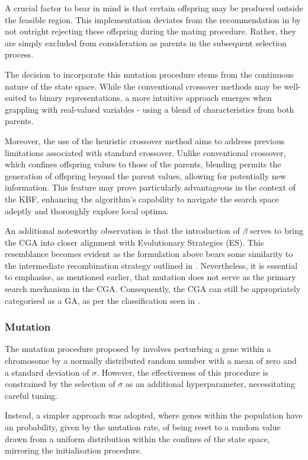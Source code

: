\documentclass[10pt]{article}
\begin{document}
\begin{multicols}{2}
A crucial factor to bear in mind is that certain offspring may be produced outside the feasible region. This implementation deviates from the recommendation in \cite{Michalewicz_2011} by not outright rejecting these offspring during the mating procedure. Rather, they are simply excluded from consideration as parents in the subsequent selection process.

The decision to incorporate this mutation procedure stems from the continuous nature of the state space. While the conventional crossover methods may be well-suited to binary representations, a more intuitive approach emerges when grappling with real-valued variables - using a blend of characteristics from both parents.

Moreover, the use of the heuristic crossover method aims to address previous limitations associated with standard crossover. Unlike conventional crossover, which confines offspring values to those of the parents, blending permits the generation of offspring beyond the parent values, allowing for potentially new information. This feature may prove particularly advantageous in the context of the KBF, enhancing the algorithm's capability to navigate the search space adeptly and thoroughly explore local optima.

An additional noteworthy observation is that the introduction of $\beta$ serves to bring the CGA into closer alignment with Evolutionary Strategies (ES). This resemblance becomes evident as the formulation above bears some similarity to the intermediate recombination strategy outlined in \cite{salimans2017evolution}. Nevertheless, it is essential to emphasise, as mentioned earlier, that mutation does not serve as the primary search mechanism in the CGA. Consequently, the CGA can still be appropriately categorised as a GA, as per the classification seen in \cite{10.1007/BFb0029787}.

\subsubsection{Mutation}

The mutation procedure proposed by \cite{PGA} involves perturbing a gene within a chromosome by a normally distributed random number with a mean of zero and a standard deviation of $\sigma$. However, the effectiveness of this procedure is constrained by the selection of $\sigma$ as an additional hyperparameter, necessitating careful tuning. 

Instead, a simpler approach was adopted, where genes within the population have an probability, given by the mutation rate, of being reset to a random value drawn from a uniform distribution within the confines of the state space, mirroring the initialisation procedure.


\end{multicols}
\end{document}
